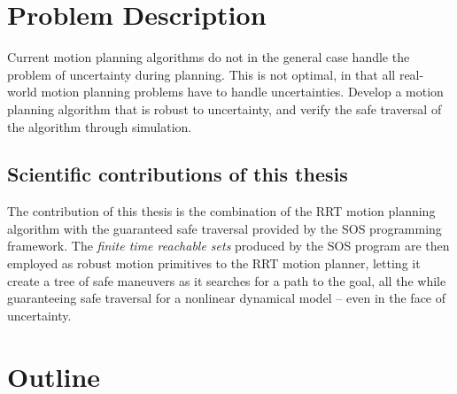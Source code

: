 \section{Problem Description}

Current motion planning algorithms do not in the general case handle the problem
of uncertainty during planning. This is not optimal, in that all real-world
motion planning problems have to handle uncertainties. Develop a motion planning
algorithm that is robust to uncertainty, and verify the safe traversal of the
algorithm through simulation.



\subsection{Scientific contributions of this thesis}

The contribution of this thesis is the combination of the \ac{RRT} motion
planning algorithm with the guaranteed safe traversal provided by the \ac{SOS}
programming framework. The \textit{finite time reachable sets} produced by the
\ac{SOS} program are then employed as robust motion primitives to the \ac{RRT}
motion planner, letting it create a tree of safe maneuvers as it searches for a
path to the goal, all the while guaranteeing safe traversal for a nonlinear
dynamical model -- even in the face of uncertainty.


\section{Outline}


